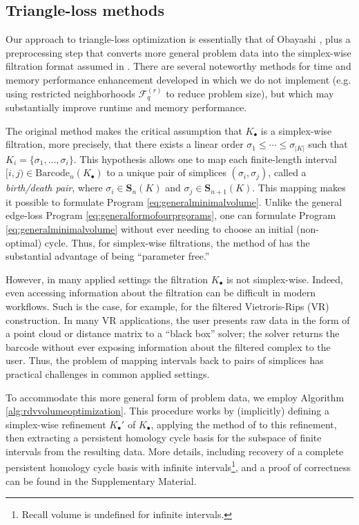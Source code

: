 \documentclass[utf8]{formatting_stuff/frontiersFPHY}
\newcommand{\Simplices}[0]{\mathbf{S}}
\newcommand{\barcode}{\mathrm{Barcode}}
\newcommand{\simplex}{\sigma}
\theoremstyle{plain}
\theoremstyle{definition}
\begin{document}
\subsection{Triangle-loss methods}
\label{sec:trianglelossmethdos}

Our approach to triangle-loss optimization is essentially that of Obayashi \cite{Obayashi2018}, plus a preprocessing step that converts more general problem data into the simplex-wise filtration format assumed in \cite{Obayashi2018}.  There are several noteworthy methods for time and memory performance enhancement developed in \cite{Obayashi2018}  which we do not implement (e.g.  using restricted neighborhoods $\mathcal{F}_q^{(r)}$ to reduce problem size), but which may substantially improve runtime and memory performance.
 
The original method makes the critical assumption that $K_\bullet$ is a simplex-wise filtration, more precisely, that there exists a linear order $\sigma_1 \le \cdots \le \sigma_{|K|}$ such that $K_i = \{\simplex_1, \ldots, \simplex_i\}$. This hypothesis allows one to map each finite-length interval $[i,j) \in \barcode_n(K_\bullet)$ to a unique pair of simplices $(\simplex_i, \simplex_j)$, called a \emph{birth/death pair}, where  $\sigma_i \in \Simplices_n(K)$ and $\sigma_j \in \Simplices_{n+1}(K)$.    This mapping makes it possible to formulate Program \eqref{eq:generalminimalvolume}. Unlike the general edge-loss Program \eqref{eq:generalformofourprgorams}, one can formulate Program \eqref{eq:generalminimalvolume} without ever needing to choose an initial (non-optimal) cycle.  Thus, for simplex-wise filtrations, the method of \cite{Obayashi2018} has the substantial advantage of being ``parameter free.''

 
However, in many applied settings the filtration $K_\bullet$ is not simplex-wise.   Indeed, even accessing information about the filtration can be difficult in modern workflows.  Such is the case, for example, for the filtered Vietroris-Rips (VR) construction. In many VR applications, the user  presents raw data in the form of a point cloud or distance matrix to a ``black box'' solver; the solver returns the barcode without ever exposing information about the filtered complex to the user. Thus, the problem of mapping intervals back to pairs of simplices has practical challenges in common applied settings.




 
To accommodate this more general form of problem data, we employ Algorithm \ref{alg:rdvvolumeoptimization}.  This procedure works by (implicitly) defining a simplex-wise refinement $K_\bullet'$ of $K_\bullet$, applying the method of \cite{Obayashi2018} to this refinement, then extracting a persistent homology cycle basis for the subspace of finite intervals from the resulting data.
 More details, including recovery of a complete persistent homology cycle basis with infinite intervals\footnote{Recall volume is undefined for infinite intervals.}, and a proof of correctness can be found in the Supplementary Material.
\end{document}
